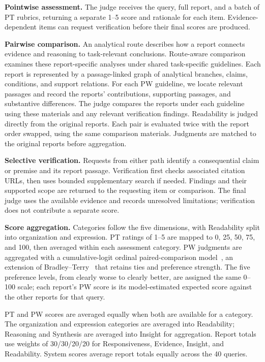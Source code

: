 \documentclass{article}
\begin{document}
\textbf{Pointwise assessment.}
The judge receives the query, full report, and a batch of PT rubrics, returning a separate 1--5 score and rationale for each item. Evidence-dependent items can request verification before their final scores are produced.

\textbf{Pairwise comparison.}
An analytical route describes how a report connects evidence and reasoning to task-relevant conclusions. Route-aware comparison examines these report-specific analyses under shared task-specific guidelines. Each report is represented by a passage-linked graph of analytical branches, claims, conditions, and support relations. For each PW guideline, we locate relevant passages and record the reports' contributions, supporting passages, and substantive differences. The judge compares the reports under each guideline using these materials and any relevant verification findings. Readability is judged directly from the original reports. Each pair is evaluated twice with the report order swapped, using the same comparison materials. Judgments are matched to the original reports before aggregation.

\textbf{Selective verification.}
Requests from either path identify a consequential claim or premise and its report passage. Verification first checks associated citation URLs, then uses bounded supplementary search if needed. Findings and their supported scope are returned to the requesting item or comparison. The final judge uses the available evidence and records unresolved limitations; verification does not contribute a separate score.

\textbf{Score aggregation.}
Categories follow the five dimensions, with Readability split into organization and expression. PT ratings of 1--5 are mapped to 0, 25, 50, 75, and 100, then averaged within each assessment category. PW judgments are aggregated with a cumulative-logit ordinal paired-comparison model~\citep{agresti1992ordinal}, an extension of Bradley--Terry~\citep{bradleyterry1952} that retains ties and preference strength. The five preference levels, from clearly worse to clearly better, are assigned the same 0--100 scale; each report's PW score is its model-estimated expected score against the other reports for that query.

PT and PW scores are averaged equally when both are available for a category. The organization and expression categories are averaged into Readability; Reasoning and Synthesis are averaged into Insight for aggregation. Report totals use weights of 30/30/20/20 for Responsiveness, Evidence, Insight, and Readability. System scores average report totals equally across the 40 queries. 
\end{document}
